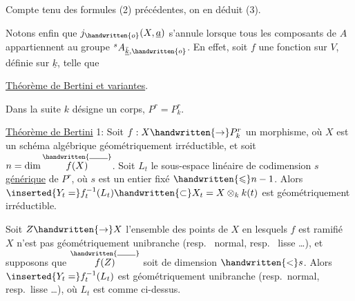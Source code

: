 Compte tenu des formules (2) précédentes, on en déduit (3).

Notons enfin que $j_{\handwritten{o}}(X,\underline{a})$ s'annule lorsque tous les composants de $A$ appartiennent au groupe ${}^{s}A_{\bar{\underline{k}},\handwritten{o}}$. En effet, soit $f$ une fonction sur $V$, définie sur $\underline{k}$, telle que



\uline{Théorème de Bertini et variantes}.

Dans la suite $k$ désigne un corps, $P^r=P^r_k$.

\uline{Théorème de Bertini} 1: Soit $f:X\handwritten{\rightarrow}P^r_k$ un morphisme, où $X$ est un schéma algébrique géométriquement irréductible, et soit $n=\dim\overset{\handwritten{\rule{1.9em}{.4pt}}}{f(X)}$. Soit $L_t$ le sous-espace linéaire de codimension $s$ \uline{générique} de $P^r$, où $s$ est un entier fixé $\handwritten{\leqslant}n-1$. Alors $\inserted{Y_t=}f_t^{-1}(L_t)\handwritten{\subset}X_t=X\otimes_k k(t)$ est géométriquement irréductible.

  Soit $Z\handwritten{\rightarrow}X$  l'ensemble des points de $X$ en lesquels  $f$ est  ramifié   $X$ n'est pas géométriquement unibranche (resp.\  normal, resp.\  lisse \ldots),  et supposons que $\overset{\handwritten{\rule{1.9em}{.4pt}}}{f(Z)}$ soit de dimension $\handwritten{<}s$. Alors $\inserted{Y_t=}f_t^{-1}(L_t)$ est géométriquement unibranche (resp.\ normal, resp.\ lisse \ldots), où $L_t$ est comme ci-dessus.

